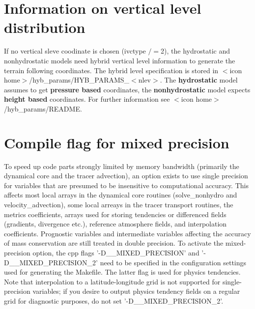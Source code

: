\section{Information on vertical level distribution}

If no vertical sleve coodinate is chosen (ivctype $/=$2), the hydrostatic and nonhydrostatic models need hybrid vertical level information to generate the
terrain following coordinates. The hybrid level specification is stored in
$<$icon home$>$/hyb\_params/HYB\_PARAMS\_$<$nlev$>$.
The {\bf hydrostatic} model assumes to get {\bf pressure based} coordinates, the {\bf nonhydrostatic}
model expects {\bf height based} coordinates. For further information see $<$icon home$>$/hyb\_params/README.

\section{Compile flag for mixed precision}

To speed up code parts strongly limited by memory bandwidth (primarily the dynamical core and the tracer advection), 
an option exists to use single precision for variables that are presumed to be insensitive to computational accuracy.
This affects most local arrays in the dynamical core routines (solve\_nonhydro and velocity\_advection), some local
arreays in the tracer transport routines, the metrics coefficients,
arrays used for storing tendencies or differenced fields (gradients, divergence etc.), reference atmosphere fields,
and interpolation coefficients. Prognostic variables and intermediate variables affecting the accuracy of mass conservation
are still treated in double precision. To activate the mixed-precision option, the cpp flags '-D\_\_MIXED\_PRECISION' and  
'-D\_\_MIXED\_PRECISION\_2' need to be specified in the configuration settings used for generating the Makefile.
The latter flag is used for physics tendencies.
Note that interpolation to a latitude-longitude grid is not supported for single-precision variables; if you desire to output
physics tendency fields on a regular grid for diagnostic purposes, do not set '-D\_\_MIXED\_PRECISION\_2'.




